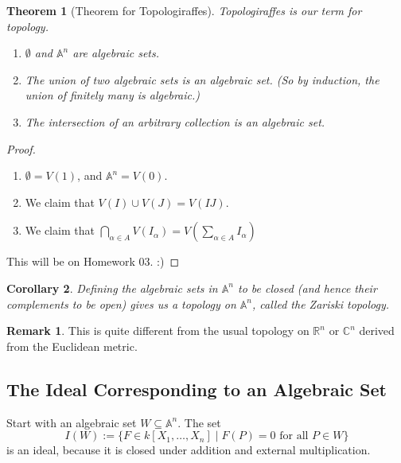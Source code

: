 \documentclass[12pt]{article}
\newcommand{\cx}{\mathbb{C}}
\newcommand{\real}{\mathbb{R}}
\newcommand{\ita}[1]{\textit{#1}}
\newtheorem{theorem}{Theorem}[section]
\newtheorem{corollary}[theorem]{Corollary}
\theoremstyle{definition}
\newtheorem*{remark}{Remark}
\begin{document}
\begin{theorem}[Theorem for Topologiraffes]
    Topologiraffes is our term for topology.
    \begin{enumerate}
        \item $\emptyset$ and $\mathbb{A}^n$ are algebraic sets.
        \item The union of two algebraic sets is an algebraic set. (So by induction, the union of finitely many is algebraic.)
        \item The intersection of an arbitrary collection is an algebraic set.
    \end{enumerate}
\end{theorem}
\begin{proof}
    $ $ \\
    \begin{enumerate}
        \item $\emptyset=V(1)$, and $\mathbb{A}^n=V(0)$. \checkmark
        \item We claim that $V(I)\cup V( J)=V(IJ)$.
        \item We claim that $\bigcap\limits_{\alpha\in A}V(I_{\alpha})=V\left(\sum\limits_{\alpha\in A}I_{\alpha}\right)$
    \end{enumerate}
    This will be on Homework 03. :)
\end{proof}
\begin{corollary}
    Defining the algebraic sets in $\mathbb{A}^n$ to be closed (and hence their complements to be open) gives us a topology on $\mathbb{A}^n$, called the \ita{Zariski topology}.
\end{corollary}
\begin{remark}
    This is quite different from the usual topology on $\real^n$ or $\cx^n$ derived from the Euclidean metric.
\end{remark}
\subsection{The Ideal Corresponding to an Algebraic Set}
Start with an algebraic set $W\subseteq\mathbb{A}^n$. The set 
\begin{equation}
    I(W):=\{F\in k[X_1,\dotsc,X_n]\mid F(P)=0\text{ for all }P\in W\}
\end{equation}
is an ideal, because it is closed under addition and external multiplication.
\end{document}
